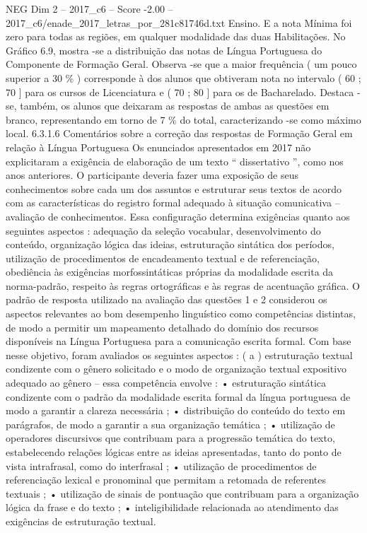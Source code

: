 \begin{textsample}{NEG Dim 2 – 2017\_c6 – Score -2.00 – 2017\_c6/enade\_2017\_letras\_por\_281c81746d.txt}
Ensino.
E a nota Mínima foi zero para todas as regiões, em qualquer modalidade das duas Habilitações.
No Gráfico 6.9, mostra -se a distribuição das notas de Língua Portuguesa do Componente de Formação Geral.
Observa -se que a maior frequência ( um pouco superior a 30 \% ) corresponde à dos alunos que obtiveram nota no intervalo ( 60 ; 70 ] para os cursos de Licenciatura e ( 70 ; 80 ] para os de Bacharelado.
Destaca -se, também, os alunos que deixaram as respostas de ambas as questões em branco, representando em torno de 7 \% do total, caracterizando -se como máximo local. 6.3.1.6 Comentários sobre a correção das respostas de Formação Geral em relação à Língua Portuguesa Os enunciados apresentados em 2017 não explicitaram a exigência de elaboração de um texto “ dissertativo ”, como nos anos anteriores.
O participante deveria fazer uma exposição de seus conhecimentos sobre cada um dos assuntos e estruturar seus textos de acordo com as características do registro formal adequado à situação comunicativa – avaliação de conhecimentos.
Essa configuração determina exigências quanto aos seguintes aspectos : adequação da seleção vocabular, desenvolvimento do conteúdo, organização lógica das ideias, estruturação sintática dos períodos, utilização de procedimentos de encadeamento textual e de referenciação, obediência às exigências morfossintáticas próprias da modalidade escrita da norma-padrão, respeito às regras ortográficas e às regras de acentuação gráfica.
O padrão de resposta utilizado na avaliação das questões 1 e 2 considerou os aspectos relevantes ao bom desempenho linguístico como competências distintas, de modo a permitir um mapeamento detalhado do domínio dos recursos disponíveis na Língua Portuguesa para a comunicação escrita formal.
Com base nesse objetivo, foram avaliados os seguintes aspectos : ( a ) estruturação textual condizente com o gênero solicitado e o modo de organização textual expositivo adequado ao gênero – essa competência envolve : • estruturação sintática condizente com o padrão da modalidade escrita formal da língua portuguesa de modo a garantir a clareza necessária ; • distribuição do conteúdo do texto em parágrafos, de modo a garantir a sua organização temática ; • utilização de operadores discursivos que contribuam para a progressão temática do texto, estabelecendo relações lógicas entre as ideias apresentadas, tanto do ponto de vista intrafrasal, como do interfrasal ; • utilização de procedimentos de referenciação lexical e pronominal que permitam a retomada de referentes textuais ; • utilização de sinais de pontuação que contribuam para a organização lógica da frase e do texto ; • inteligibilidade relacionada ao atendimento das exigências de estruturação textual.

\end{textsample}
